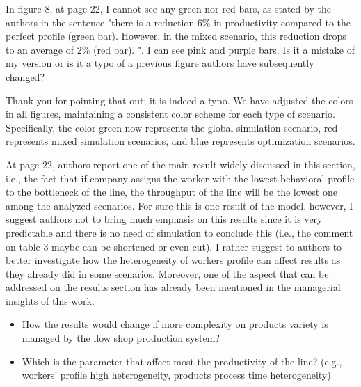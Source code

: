 \documentclass[preprint,11pt,3p]{elsarticle}
\begin{document}
\begin{tcolorbox}[colback=q_color1,colframe=q_color2,title=Q16  :]	
    In figure 8, at page 22, I cannot see any green nor red bars, as stated by the authors in the sentence "there is a reduction 6\% in productivity compared to the perfect profile (green bar). However, in the mixed scenario, this reduction drops to an average of 2\% (red bar). ". I can see pink and purple bars. Is it a mistake of my version or is it a typo of a previous figure authors have subsequently changed?
\end{tcolorbox}
\begin{tcolorbox}[colback=r_color1,colframe=r_color2,title=Response Q16  :]
Thank you for pointing that out; it is indeed a typo. We have adjusted the colors in all figures, maintaining a consistent color scheme for each type of scenario. Specifically, the color green now represents the global simulation scenario, red represents mixed simulation scenarios, and blue represents optimization scenarios.
\end{tcolorbox}
\begin{tcolorbox}[colback=q_color1,colframe=q_color2,title=Q17:]	

 
 At page 22, authors report one of the main result widely discussed in this section, i.e., the fact that if company assigns the worker with the lowest behavioral profile to the bottleneck of the line, the throughput of the line will be the lowest one among the analyzed scenarios. For sure this is one result of the model, however, I suggest authors not to bring much emphasis on this results since it is very predictable and there is no need of simulation to conclude this (i.e., the comment on table 3 maybe can be shortened or even cut). I rather suggest to authors to better investigate how the heterogeneity of workers profile can affect results as they already did in some scenarios. Moreover, one of the aspect that can be addressed on the results section has already been mentioned in the managerial insights of this work.
	\begin{itemize}
		\item  How the results would change if more complexity on products variety is managed by the flow shop production system?
		\item  Which is the parameter that affect most the productivity of the line? (e.g., workers' profile high heterogeneity, products process time heterogeneity)
	\end{itemize}
	
\end{tcolorbox}
\end{document}
